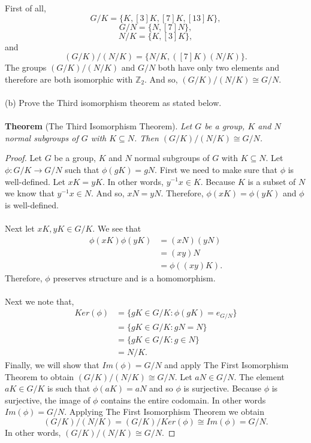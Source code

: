 \documentclass[11pt]{article}
\begin{document}
First of all,
\[ G/K = \{K, [3]K, [7]K, [13]K\},\]
\[ G/N = \{N, [7]N\}, \]
\[ N/K = \{K, [3]K\},\]
and
\[(G/K)/(N/K) = \{ N/K, ([7]K)(N/K) \}.\]
The groups $(G/K)/(N/K)$ and $G/N$ both have only two elements and therefore are both isomorphic with $\mathbb{Z}_2$. And so, $(G/K)/(N/K) \cong G/N$.\\
~\\
(b) Prove the Third isomorphism theorem as stated below.\\
~\\
{\bf Theorem} (The Third Isomorphism Theorem). {\it Let $G$ be a group, $K$ and $N$ normal subgroups of $G$ with $K \subseteq N$. Then $(G/K)/(N/K) \cong G/N$.}
\begin{proof}
Let $G$ be a group, $K$ and $N$ normal subgroups of $G$ with $K \subseteq N$. Let $\phi : G/K \rightarrow G/N$ such that $\phi(gK) = gN $. First we need to make sure that $\phi$ is well-defined. Let $xK = yK$. In other words, $y^{-1}x \in K$. Because $K$ is a subset of $N$ we know that $y^{-1}x \in N$. And so, $xN = yN$. Therefore, $\phi(xK) = \phi(yK)$ and $\phi$ is well-defined.\\
~\\
Next let $xK,yK \in G/K $. We see that
\begin{align*}
\phi(xK)\phi(yK) &= (xN)(yN)\\
&= (xy)N\\
&= \phi((xy)K).
\end{align*}
Therefore, $\phi$ preserves structure and is a homomorphism. \\
~\\
Next we note that,
\begin{align*}
Ker(\phi) &= \{gK \in G/K: \phi(gK) = e_{G/N} \}\\
&= \{ gK \in G/K: gN = N \}\\
&= \{ gK \in G/K: g \in N \}\\
&= N/K.
\end{align*}
Finally, we will show that $Im(\phi) = G/N$ and apply The First Isomorphism Theorem to obtain $(G/K)/(N/K) \cong G/N$. Let $aN\in G/N$. The element $ aK\in G/K $ is such that $ \phi(aK) =aN $ and so $\phi$ is surjective. Because $\phi$ is surjective, the image of $\phi$ contains the entire codomain. In other words $ Im(\phi)=G/N $. Applying The First Isomorphism Theorem we obtain
\[ (G/K)/(N/K) = (G/K)/Ker(\phi) \cong Im(\phi) = G/N. \]
In other words, $(G/K)/(N/K) \cong G/N$.

\end{proof}
~\\
\end{document}
